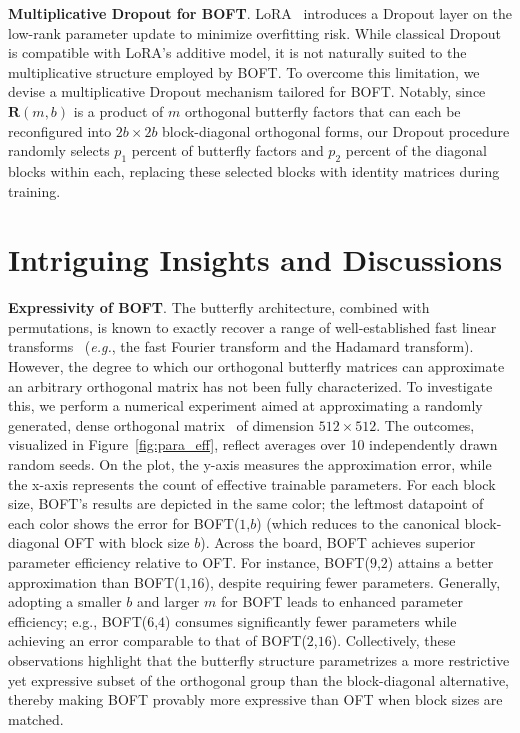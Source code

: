 \textbf{Multiplicative Dropout for BOFT}. LoRA~\cite{hulora2022} introduces a Dropout layer on the low-rank parameter update to minimize overfitting risk. While classical Dropout~\cite{srivastava2014dropout} is compatible with LoRA's additive model, it is not naturally suited to the multiplicative structure employed by BOFT. To overcome this limitation, we devise a multiplicative Dropout mechanism tailored for BOFT. Notably, since $\bm{R}(m,b)$ is a product of $m$ orthogonal butterfly factors that can each be reconfigured into $2b\times 2b$ block-diagonal orthogonal forms, our Dropout procedure randomly selects $p_1$ percent of butterfly factors and $p_2$ percent of the diagonal blocks within each, replacing these selected blocks with identity matrices during training.

\section{Intriguing Insights and Discussions}

\textbf{Expressivity of BOFT}. The butterfly architecture, combined with permutations, is known to exactly recover a range of well-established fast linear transforms~\cite{dao2019learning,dao2019kaleidoscope} (\emph{e.g.}, the fast Fourier transform and the Hadamard transform). However, the degree to which our orthogonal butterfly matrices can approximate an arbitrary orthogonal matrix has not been fully characterized. To investigate this, we perform a numerical experiment aimed at approximating a randomly generated, dense orthogonal matrix~\cite{anderson1987generation} of dimension $512\times 512$. The outcomes, visualized in Figure~\ref{fig:para_eff}, reflect averages over 10 independently drawn random seeds. On the plot, the y-axis measures the approximation error, while the x-axis represents the count of effective trainable parameters. For each block size, BOFT’s results are depicted in the same color; the leftmost datapoint of each color shows the error for BOFT($1$,$b$) (which reduces to the canonical block-diagonal OFT with block size $b$). Across the board, BOFT achieves superior parameter efficiency relative to OFT. For instance, BOFT($9$,$2$) attains a better approximation than BOFT($1$,$16$), despite requiring fewer parameters. Generally, adopting a smaller $b$ and larger $m$ for BOFT leads to enhanced parameter efficiency; e.g., BOFT($6$,$4$) consumes significantly fewer parameters while achieving an error comparable to that of BOFT($2$,$16$). Collectively, these observations highlight that the butterfly structure parametrizes a more restrictive yet expressive subset of the orthogonal group than the block-diagonal alternative, thereby making BOFT provably more expressive than OFT when block sizes are matched.


